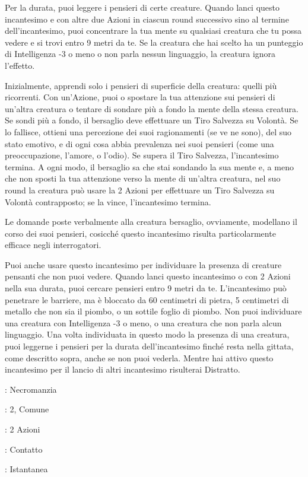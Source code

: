 \begin{multicols}{2}
Per la durata, puoi leggere i pensieri di certe creature. Quando lanci questo incantesimo e con altre due Azioni in ciascun round successivo sino al termine dell'incantesimo, puoi concentrare la tua mente su qualsiasi creatura che tu possa vedere e si trovi entro 9 metri da te. Se la creatura che hai scelto ha un punteggio di Intelligenza -3 o meno o non parla nessun linguaggio, la creatura ignora l'effetto.

Inizialmente, apprendi solo i pensieri di superficie della creatura: quelli più ricorrenti. Con un'Azione, puoi o spostare la tua attenzione sui pensieri di un'altra creatura o tentare di sondare più a fondo la mente della stessa creatura. Se sondi più a fondo, il bersaglio deve effettuare un Tiro Salvezza su Volontà. Se lo fallisce, ottieni una percezione dei suoi ragionamenti (se ve ne sono), del suo stato emotivo, e di ogni cosa abbia prevalenza nei suoi pensieri (come una preoccupazione, l'amore, o l'odio). Se supera il Tiro Salvezza, l'incantesimo termina. A ogni modo, il bersaglio sa che stai sondando la sua mente e, a meno che non sposti la tua attenzione verso la mente di un'altra creatura, nel suo round la creatura può usare la 2 Azioni per effettuare un Tiro Salvezza su Volontà contrapposto; se la vince, l'incantesimo termina.

Le domande poste verbalmente alla creatura bersaglio, ovviamente, modellano il corso dei suoi pensieri, cosicché questo incantesimo risulta particolarmente efficace negli interrogatori.

Puoi anche usare questo incantesimo per individuare la presenza di creature pensanti che non puoi vedere. Quando lanci questo incantesimo o con 2 Azioni nella sua durata, puoi cercare pensieri entro 9 metri da te. L'incantesimo può penetrare le barriere, ma è bloccato da 60 centimetri di pietra, 5 centimetri di metallo che non sia il piombo, o un sottile foglio di piombo. Non puoi individuare una creatura con Intelligenza -3 o meno, o una creatura che non parla alcun linguaggio. Una volta individuata in questo modo la presenza di una creatura, puoi leggerne i pensieri per la durata dell'incantesimo finché resta nella gittata, come descritto sopra, anche se non puoi vederla.
Mentre hai attivo questo incantesimo per il lancio di altri incantesimo risulterai Distratto.

\noindent\colorbox{OBSSgold!10}{
\begin{minipage}{0.95\linewidth}
\begin{description}[noitemsep, topsep=0pt, parsep=0pt, partopsep=0pt, leftmargin=0cm, labelwidth=1.3cm]
	\item[\textbf{Lista}]: Necromanzia
	\item[\textbf{Livello}]: 2, Comune
	\item[\textbf{Lancio}]: 2 Azioni
	\item[\textbf{Gittata}]: Contatto
	\item[\textbf{Durata}]: Istantanea
\end{description}
\end{minipage}}\smallskip


\end{multicols}
